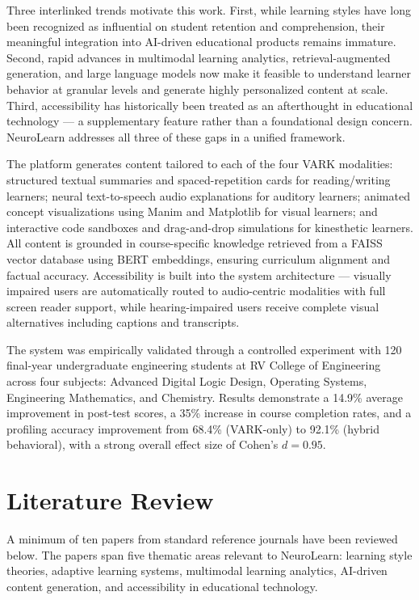 Three interlinked trends motivate this work. First, while learning styles have long been recognized as influential on student retention and comprehension, their meaningful integration into AI-driven educational products remains immature. Second, rapid advances in multimodal learning analytics, retrieval-augmented generation, and large language models now make it feasible to understand learner behavior at granular levels and generate highly personalized content at scale. Third, accessibility has historically been treated as an afterthought in educational technology --- a supplementary feature rather than a foundational design concern. NeuroLearn addresses all three of these gaps in a unified framework.

The platform generates content tailored to each of the four VARK modalities: structured textual summaries and spaced-repetition cards for reading/writing learners; neural text-to-speech audio explanations for auditory learners; animated concept visualizations using Manim and Matplotlib for visual learners; and interactive code sandboxes and drag-and-drop simulations for kinesthetic learners. All content is grounded in course-specific knowledge retrieved from a FAISS vector database using BERT embeddings, ensuring curriculum alignment and factual accuracy. Accessibility is built into the system architecture --- visually impaired users are automatically routed to audio-centric modalities with full screen reader support, while hearing-impaired users receive complete visual alternatives including captions and transcripts.

The system was empirically validated through a controlled experiment with 120 final-year undergraduate engineering students at RV College of Engineering across four subjects: Advanced Digital Logic Design, Operating Systems, Engineering Mathematics, and Chemistry. Results demonstrate a 14.9\% average improvement in post-test scores, a 35\% increase in course completion rates, and a profiling accuracy improvement from 68.4\% (VARK-only) to 92.1\% (hybrid behavioral), with a strong overall effect size of Cohen's $d = 0.95$.

\section[Literature Review]{\textbf{Literature Review}}

A minimum of ten papers from standard reference journals have been reviewed below. The papers span five thematic areas relevant to NeuroLearn: learning style theories, adaptive learning systems, multimodal learning analytics, AI-driven content generation, and accessibility in educational technology.

